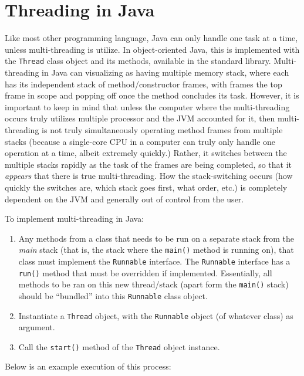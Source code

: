 \documentclass{tufte-handout}
\begin{document}
    \section*{Threading in Java}
    Like most other programming language, Java can only handle one task at a time, unless multi-threading is utilize. In object-oriented Java, this is implemented with the \texttt{Thread} class object and its methods, available in the standard library. Multi-threading in Java can visualizing as having multiple memory stack, where each has its independent stack of method/constructor frames, with frames the top frame in scope and popping off once the method concludes its task. However, it is important to keep in mind that unless the computer where the multi-threading occurs truly utilizes multiple processor and the JVM accounted for it, then multi-threading is not truly simultaneously operating method frames from multiple stacks (because a single-core CPU in a computer can truly only handle one operation at a time, albeit extremely quickly.) Rather, it switches between the multiple stacks rapidly as the task of the frames are being completed, so that it \emph{appears} that there is true multi-threading. How the stack-switching occurs (how quickly the switches are, which stack goes first, what order, etc.) is completely dependent on the JVM and generally out of control from the user.

    To implement multi-threading in Java:

    \begin{enumerate}
        \item Any methods from a class that needs to be run on a separate stack from the \emph{main} stack (that is, the stack where the \texttt{main()} method is running on), that class must implement the \texttt{Runnable} interface. The \texttt{Runnable} interface has a \texttt{run()} method that must be overridden if implemented. Essentially, all methods to be ran on this new thread/stack (apart form the \texttt{main()} stack) should be ``bundled'' into this \texttt{Runnable} class object.
        \item Instantiate a \texttt{Thread} object, with the \texttt{Runnable} object (of whatever class) as argument.
        \item Call the \texttt{start()} method of the \texttt{Thread} object instance. 
    \end{enumerate}

    Below is an example execution of this process:
\end{document}
